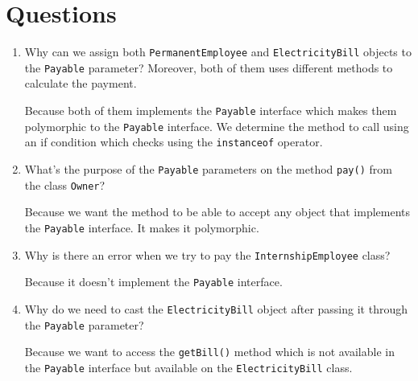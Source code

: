 \documentclass[12pt,titlepage]{article}
\begin{document}
\section{Questions}
\begin{enumerate}
    \item {
        Why can we assign both \texttt{PermanentEmployee} and \texttt{ElectricityBill} objects to the \texttt{Payable} parameter? Moreover, both of them uses
        different methods to calculate the payment.

        Because both of them implements the \texttt{Payable} interface which makes them polymorphic to the \texttt{Payable} interface.
        We determine the method to call using an if condition which checks using the \texttt{instanceof} operator.
    }
    \item {
        What's the purpose of the \texttt{Payable} parameters on the method \texttt{pay()} from the class \texttt{Owner}?

        Because we want the method to be able to accept any object that implements the \texttt{Payable} interface. It makes it polymorphic.
    }
    \item {
        Why is there an error when we try to pay the \texttt{InternshipEmployee} class?

        Because it doesn't implement the \texttt{Payable} interface.
    }
    \item {
        Why do we need to cast the \texttt{ElectricityBill} object after passing it through the \texttt{Payable} parameter?

        Because we want to access the \texttt{getBill()} method which is not available in the \texttt{Payable} interface but available on the \texttt{ElectricityBill} class.
    }
\end{enumerate}
\end{document}
